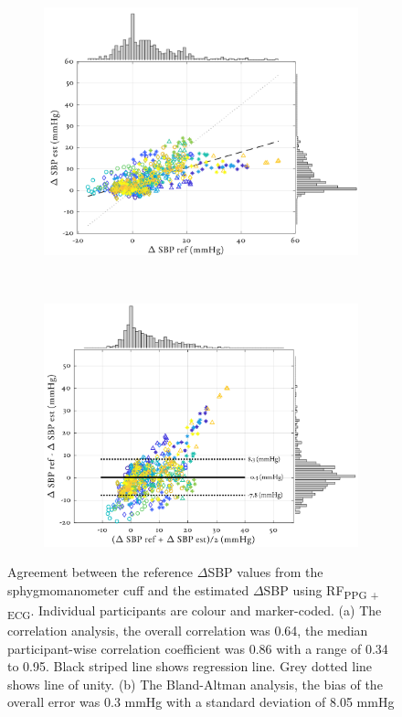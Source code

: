 \documentclass[fleqn,10pt]{wlscirep}
\begin{document}
\begin{figure}[ht]
	\centering
	\begin{subfigure}{.49\textwidth}
		\centering
		\includegraphics[width = \linewidth]{delta_BP_correlation.png}
		\caption{}
	\end{subfigure}
	~
	\begin{subfigure}{.49\textwidth}
		\centering
		\includegraphics[width = \linewidth]{delta_BP_BA.png}
		\caption{}
	\end{subfigure}
	\caption{Agreement between the reference $\Delta$SBP values from the sphygmomanometer cuff and the estimated $\Delta$SBP using RF\textsubscript{PPG + ECG}. Individual participants are colour and marker-coded. (a) The correlation analysis, the overall correlation was 0.64, the median participant-wise correlation coefficient was 0.86 with a range of 0.34 to 0.95. Black striped line shows regression line. Grey dotted line shows line of unity. (b) The Bland-Altman analysis, the bias of the overall error was 0.3 mmHg with a standard deviation of 8.05 mmHg}
	\label{fig:results}
\end{figure}
\end{document}
